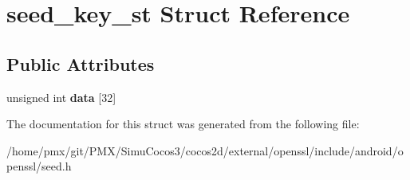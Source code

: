 \hypertarget{structseed__key__st}{}\section{seed\+\_\+key\+\_\+st Struct Reference}
\label{structseed__key__st}
\subsection*{Public Attributes}
\begin{DoxyCompactItemize}
\item 
\mbox{\label{structseed__key__st_a9651f299bf48baa0d40c04f059a918be}} 
unsigned int {\bfseries data} \mbox{[}32\mbox{]}
\end{DoxyCompactItemize}


The documentation for this struct was generated from the following file\+:\begin{DoxyCompactItemize}
\item 
/home/pmx/git/\+P\+M\+X/\+Simu\+Cocos3/cocos2d/external/openssl/include/android/openssl/seed.\+h\end{DoxyCompactItemize}
